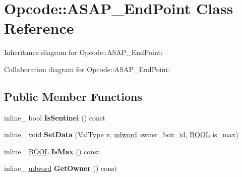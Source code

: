\hypertarget{class_opcode_1_1_a_s_a_p___end_point}{\section{Opcode\+:\+:A\+S\+A\+P\+\_\+\+End\+Point Class Reference}
\label{class_opcode_1_1_a_s_a_p___end_point}
}


Inheritance diagram for Opcode\+:\+:A\+S\+A\+P\+\_\+\+End\+Point\+:


Collaboration diagram for Opcode\+:\+:A\+S\+A\+P\+\_\+\+End\+Point\+:
\subsection*{Public Member Functions}
\begin{DoxyCompactItemize}
\item 
\hypertarget{class_opcode_1_1_a_s_a_p___end_point_a23acfd9dc2f38cadeb0bd74382181d11}{inline\+\_\+ bool {\bfseries Is\+Sentinel} () const }\label{class_opcode_1_1_a_s_a_p___end_point_a23acfd9dc2f38cadeb0bd74382181d11}

\item 
\hypertarget{class_opcode_1_1_a_s_a_p___end_point_a6247ddd7fb1bbcd5318dade6b484c951}{inline\+\_\+ void {\bfseries Set\+Data} (Val\+Type v, \hyperlink{_ice_types_8h_a44c6f1920ba5551225fb534f9d1a1733}{udword} owner\+\_\+box\+\_\+id, \hyperlink{_ice_types_8h_a050c65e107f0c828f856a231f4b4e788}{B\+O\+O\+L} is\+\_\+max)}\label{class_opcode_1_1_a_s_a_p___end_point_a6247ddd7fb1bbcd5318dade6b484c951}

\item 
\hypertarget{class_opcode_1_1_a_s_a_p___end_point_a8e7dddbd9c32775c5c7587a57fd409d8}{inline\+\_\+ \hyperlink{_ice_types_8h_a050c65e107f0c828f856a231f4b4e788}{B\+O\+O\+L} {\bfseries Is\+Max} () const }\label{class_opcode_1_1_a_s_a_p___end_point_a8e7dddbd9c32775c5c7587a57fd409d8}

\item 
\hypertarget{class_opcode_1_1_a_s_a_p___end_point_a4ff065f873ea149836eff56c311967f3}{inline\+\_\+ \hyperlink{_ice_types_8h_a44c6f1920ba5551225fb534f9d1a1733}{udword} {\bfseries Get\+Owner} () const }\label{class_opcode_1_1_a_s_a_p___end_point_a4ff065f873ea149836eff56c311967f3}

\end{DoxyCompactItemize}
